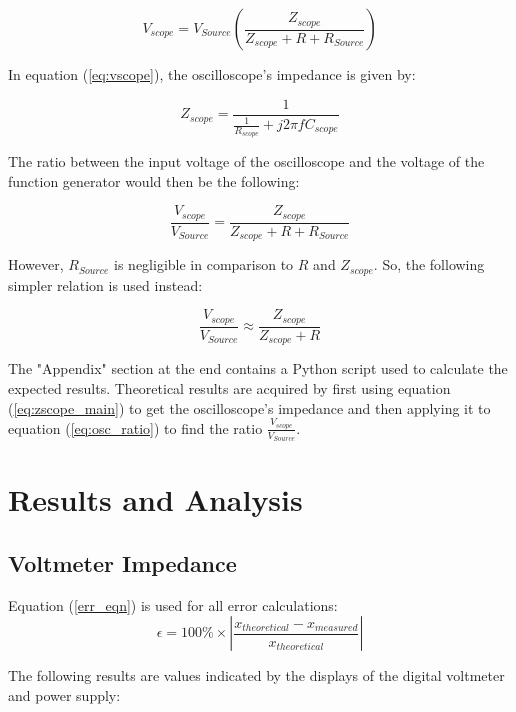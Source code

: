 \documentclass[a4paper,titlepage,10pt]{article}
\begin{document}
\begin{equation}
	\label{eq:vscope}
	V_{scope} = V_{Source}(\frac{Z_{scope}}{Z_{scope} + R + R_{Source}}) 
\end{equation}

In equation (\ref{eq:vscope}), the oscilloscope's impedance is given by:

\begin{equation}
	\label{eq:zscope_main}
	Z_{scope} = \frac{1}{ \frac{1}{R_{scope}} + j 2 \pi f C_{scope}}
\end{equation}
	
The ratio between the input voltage of the oscilloscope and the voltage of the function generator would then be the following:

\begin{equation}
	\label{eq:osc_ratio_original}
	\frac{V_{scope}}{V_{Source}} = \frac{Z_{scope}}{Z_{scope} + R + R_{Source}}
\end{equation}

However, $R_{Source}$ is negligible in comparison to $R$ and $Z_{scope}$. So, the following simpler relation is used instead:

\begin{equation}
	\label{eq:osc_ratio}
	\frac{V_{scope}}{V_{Source}} \approx \frac{Z_{scope}}{Z_{scope} + R}
\end{equation}

The "Appendix" section at the end contains a Python script used to calculate the expected results. Theoretical results are acquired by first using equation (\ref{eq:zscope_main}) to get the oscilloscope's impedance and then applying it to equation (\ref{eq:osc_ratio}) to find the ratio $\frac{V_{scope}}{V_{Source}}$.

\section{Results and Analysis}
\subsection{Voltmeter Impedance}
%

Equation (\ref{err_eqn}) is used for all error calculations:
\begin{equation}
\label{err_eqn}
\epsilon = 100\% \times | \frac{x_{theoretical} - x_{measured}}{x_{theoretical}} |
\end{equation}

The following results are values indicated by the displays of the digital voltmeter and power supply:
	
\end{document}
